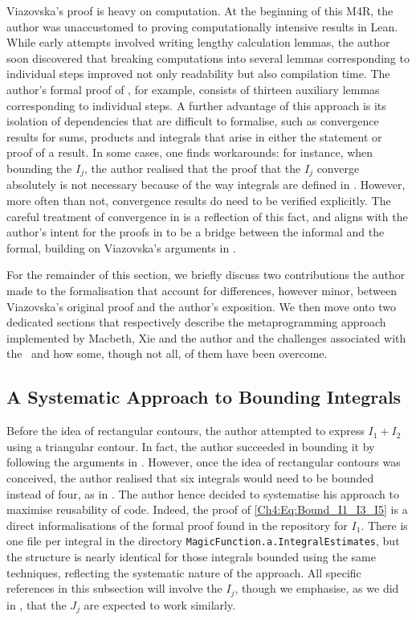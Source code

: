 Viazovska's proof is heavy on computation. At the beginning of this M4R, the author was unaccustomed to proving computationally intensive results in Lean. While early attempts involved writing lengthy calculation lemmas, the author soon discovered that breaking computations into several lemmas corresponding to individual steps improved not only readability but also compilation time. The author's formal proof of , for example, consists of thirteen auxiliary lemmas corresponding to individual steps. A further advantage of this approach is its isolation of dependencies that are difficult to formalise, such as convergence results for sums, products and integrals that arise in either the statement or proof of a result. In some cases, one finds workarounds: for instance, when bounding the $I_j$, the author realised that the proof that the $I_j$ converge absolutely is not necessary because of the way integrals are defined in \mathlib. However, more often than not, convergence results do need to be verified explicitly. The careful treatment of convergence in  is a reflection of this fact, and aligns with the author's intent for the proofs in  to be a bridge between the informal and the formal, building on Viazovska's arguments in \cite[\S 7]{blueprint}.

For the remainder of this section, we briefly discuss two contributions the author made to the formalisation that account for differences, however minor, between Viazovska's original proof and the author's exposition. We then move onto two dedicated sections that respectively describe the metaprogramming approach implemented by Macbeth, Xie and the author and the challenges associated with the \CGT\ and how some, though not all, of them have been overcome.

\subsection{A Systematic Approach to Bounding Integrals}
\label{Ch5:Subsec:Bounding_Integrals}

Before the idea of rectangular contours, the author attempted to express $I_1 + I_2$ using a triangular contour. In fact, the author succeeded in bounding it by following the arguments in \cite{Viazovska8}. However, once the idea of rectangular contours was conceived, the author realised that six integrals would need to be bounded instead of four, as in \cite{Viazovska8}. The author hence decided to systematise his approach to maximise reusability of code. Indeed, the proof of \eqref{Ch4:Eq:Bound_I1_I3_I5} is a direct informalisations of the formal proof found in the repository for $I_1$. There is one file per integral in the directory \lstinline|MagicFunction.a.IntegralEstimates|, but the structure is nearly identical for those integrals bounded using the same techniques, reflecting the systematic nature of the approach. All specific references in this subsection will involve the $I_j$, though we emphasise, as we did in , that the $J_j$ are expected to work similarly.

